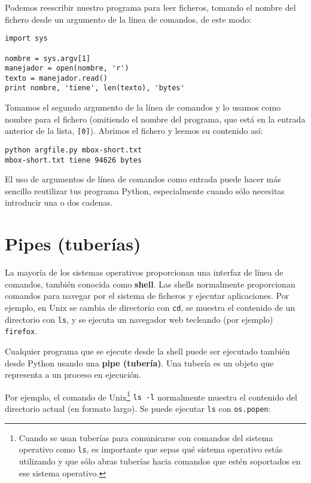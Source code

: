 Podemos reescribir nuestro programa para leer ficheros, tomando el nombre del fichero
desde un argumento de la línea de comandos, de este modo:

\beforeverb
\begin{verbatim}
import sys

nombre = sys.argv[1]
manejador = open(nombre, 'r')
texto = manejador.read()
print nombre, 'tiene', len(texto), 'bytes'
\end{verbatim}
\afterverb
%
Tomamos el segundo argumento de la línea de comandos y lo usamos como nombre para el fichero
(omitiendo el nombre del programa, que está en la entrada anterior de la lista, {\tt [0]}).
Abrimos el fichero y leemos su contenido así:

\beforeverb
\begin{verbatim}
python argfile.py mbox-short.txt
mbox-short.txt tiene 94626 bytes
\end{verbatim}
\afterverb
%
El uso de argumentos de línea de comandos como entrada puede hacer más sencillo reutilizar tus
programa Python, especialmente cuando sólo necesitas introducir una o dos cadenas.

\section{Pipes (tuberías)}


La mayoría de los sistemas operativos proporcionan una interfaz de línea de comandos,
también conocida como {\bf shell}. Las shells normalmente proporcionan comandos
para navegar por el sistema de ficheros y ejecutar aplicaciones. Por
ejemplo, en Unix se cambia de directorio con {\tt cd},
se muestra el contenido de un directorio con {\tt ls}, y se ejecuta
un navegador web tecleando (por ejemplo) {\tt firefox}.


Cualquier programa que se ejecute desde la shell puede ser ejecutado
también desde Python usando una {\bf pipe (tubería)}. Una tubería es un objeto
que representa a un proceso en ejecución.

Por ejemplo, el comando de Unix\footnote{Cuando se usan tuberías para comunicarse
con comandos del sistema operativo como {\tt ls}, es importante
que sepas qué sistema operativo estás utilizando y que sólo abras
tuberías hacia comandos que estén soportados en ese sistema operativo.}
{\tt ls -l} normalmente muestra el
contenido del directorio actual (en formato largo). Se puede
ejecutar {\tt ls} con {\tt os.popen}:

